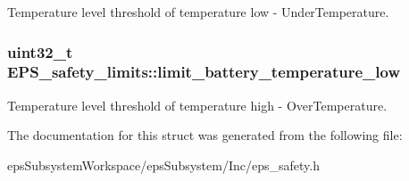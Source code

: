 Temperature level threshold of temperature low -\/ Under\-Temperature. \hypertarget{struct_e_p_s__safety__limits_a2395c833f98b5c3df23b252719b85097}{
\subsubsection[{limit\-\_\-battery\-\_\-temperature\-\_\-low}]{\setlength{\rightskip}{0pt plus 5cm}uint32\-\_\-t E\-P\-S\-\_\-safety\-\_\-limits\-::limit\-\_\-battery\-\_\-temperature\-\_\-low}}\label{struct_e_p_s__safety__limits_a2395c833f98b5c3df23b252719b85097}
Temperature level threshold of temperature high -\/ Over\-Temperature. 

The documentation for this struct was generated from the following file\-:\begin{DoxyCompactItemize}
\item 
eps\-Subsystem\-Workspace/eps\-Subsystem/\-Inc/eps\-\_\-safety.\-h\end{DoxyCompactItemize}
